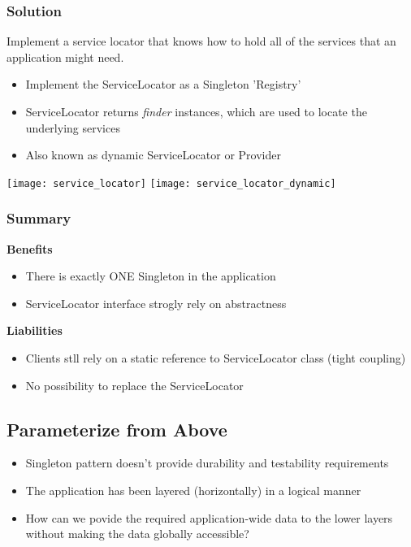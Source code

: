 \subsubsection{Solution}
Implement a service locator that knows how to hold all of the services that an application might need.
\begin{itemize}[topsep=0pt]
    \itemsep -0.4em
    \item Implement the ServiceLocator as a Singleton 'Registry'
    \item ServiceLocator returns \textit{finder} instances, which are used to locate the underlying services
    \item Also known as dynamic ServiceLocator or Provider
\end{itemize} 
\texttt{[image: service\_locator]}
\texttt{[image: service\_locator\_dynamic]}
\subsubsection{Summary}
\textbf{Benefits}
\begin{itemize}[topsep=0pt]
    \itemsep -0.4em
    \item There is exactly ONE Singleton in the application
    \item ServiceLocator interface strogly rely on abstractness
\end{itemize}
\textbf{Liabilities}
\begin{itemize}[topsep=0pt]
    \itemsep -0.4em
    \item Clients stll rely on a static reference to ServiceLocator class (tight coupling)
    \item No possibility to replace the ServiceLocator 
\end{itemize}

\subsection{Parameterize from Above}
\begin{itemize}[topsep=0pt]
    \itemsep -0.4em
    \item Singleton pattern doesn't provide durability and testability requirements
    \item The application has been layered (horizontally) in a logical manner
    \item How can we povide the required application-wide data to the lower layers without making the data globally accessible?
\end{itemize}
